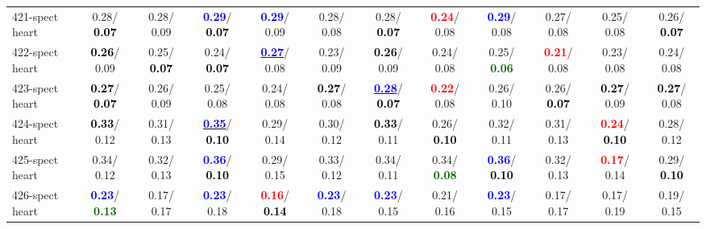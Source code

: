 \begin{table}[h]
\begin{center}
{\begin{tabular}{lc|c|c|c|c|c|c|c|c|c|c}
421-spect heart &   0.28/\textcolor{black}{\textbf{  0.07}} &   0.28/  0.09 & \textcolor{blue}{\textbf{  0.29}}/\textcolor{black}{\textbf{  0.07}} & \textcolor{blue}{\textbf{  0.29}}/  0.09 &   0.28/  0.08 &   0.28/\textcolor{black}{\textbf{  0.07}} & \textcolor{red}{\textbf{  0.24}}/  0.08 & \textcolor{blue}{\textbf{  0.29}}/  0.08 &   0.27/  0.08 &   0.25/  0.08 &   0.26/\textcolor{black}{\textbf{  0.07}} \\
422-spect heart & \textcolor{black}{\textbf{  0.26}}/  0.09 &   0.25/\textcolor{black}{\textbf{  0.07}} &   0.24/\textcolor{black}{\textbf{  0.07}} & \underline{\textcolor{blue}{\textbf{  0.27}}}/  0.08 &   0.23/  0.09 & \textcolor{black}{\textbf{  0.26}}/  0.09 &   0.24/  0.08 &   0.25/\textcolor{darkgreen}{\textbf{  0.06}} & \textcolor{red}{\textbf{  0.21}}/  0.08 &   0.23/  0.08 &   0.24/  0.08 \\
423-spect heart & \textcolor{black}{\textbf{  0.27}}/\textcolor{black}{\textbf{  0.07}} &   0.26/  0.09 &   0.25/  0.08 &   0.24/  0.08 & \textcolor{black}{\textbf{  0.27}}/  0.08 & \underline{\textcolor{blue}{\textbf{  0.28}}}/\textcolor{black}{\textbf{  0.07}} & \textcolor{red}{\textbf{  0.22}}/  0.08 &   0.26/  0.10 &   0.26/\textcolor{black}{\textbf{  0.07}} & \textcolor{black}{\textbf{  0.27}}/  0.09 & \textcolor{black}{\textbf{  0.27}}/  0.08 \\ \hline
424-spect heart & \textcolor{black}{\textbf{  0.33}}/  0.12 &   0.31/  0.13 & \underline{\textcolor{blue}{\textbf{  0.35}}}/\textcolor{black}{\textbf{  0.10}} &   0.29/  0.14 &   0.30/  0.12 & \textcolor{black}{\textbf{  0.33}}/  0.11 &   0.26/\textcolor{black}{\textbf{  0.10}} &   0.32/  0.11 &   0.31/  0.13 & \textcolor{red}{\textbf{  0.24}}/\textcolor{black}{\textbf{  0.10}} &   0.28/  0.12 \\
425-spect heart &   0.34/  0.12 &   0.32/  0.13 & \textcolor{blue}{\textbf{  0.36}}/\textcolor{black}{\textbf{  0.10}} &   0.29/  0.15 &   0.33/  0.12 &   0.34/  0.11 &   0.34/\textcolor{darkgreen}{\textbf{  0.08}} & \textcolor{blue}{\textbf{  0.36}}/\textcolor{black}{\textbf{  0.10}} &   0.32/  0.13 & \textcolor{red}{\textbf{  0.17}}/  0.14 &   0.29/\textcolor{black}{\textbf{  0.10}} \\
426-spect heart & \textcolor{blue}{\textbf{  0.23}}/\textcolor{darkgreen}{\textbf{  0.13}} &   0.17/  0.17 & \textcolor{blue}{\textbf{  0.23}}/  0.18 & \textcolor{red}{\textbf{  0.16}}/\textcolor{black}{\textbf{  0.14}} & \textcolor{blue}{\textbf{  0.23}}/  0.18 & \textcolor{blue}{\textbf{  0.23}}/  0.15 &   0.21/  0.16 & \textcolor{blue}{\textbf{  0.23}}/  0.15 &   0.17/  0.17 &   0.17/  0.19 &   0.19/  0.15 \\

\end{tabular}}
\end{center}
\end{table}
